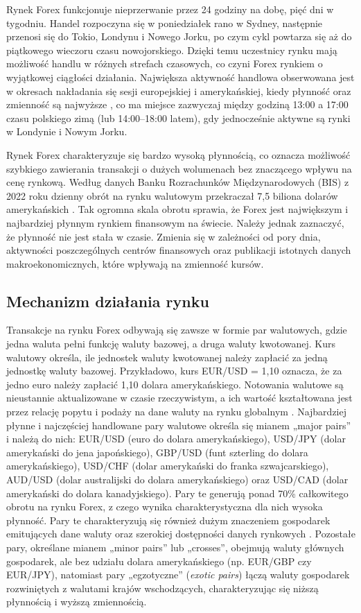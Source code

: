 Rynek Forex funkcjonuje nieprzerwanie przez 24 godziny na dobę, pięć dni w tygodniu. 
Handel rozpoczyna się w poniedziałek rano w Sydney, następnie przenosi się do Tokio, Londynu i Nowego Jorku, po czym cykl powtarza się aż do piątkowego wieczoru czasu nowojorskiego.
Dzięki temu uczestnicy rynku mają możliwość handlu w różnych strefach czasowych, co czyni Forex rynkiem o wyjątkowej ciągłości działania. 
Największa aktywność handlowa obserwowana jest w okresach nakładania się sesji europejskiej i amerykańskiej, kiedy płynność oraz zmienność są najwyższe \parencite{bis2022},
co ma miejsce zazwyczaj między godziną 13:00 a 17:00 czasu polskiego zimą (lub 14:00–18:00 latem), gdy jednocześnie aktywne są rynki w Londynie i Nowym Jorku.

Rynek Forex charakteryzuje się bardzo wysoką płynnością, co oznacza możliwość szybkiego zawierania transakcji o dużych wolumenach bez znaczącego wpływu na cenę rynkową. 
Według danych Banku Rozrachunków Międzynarodowych (BIS) z 2022 roku dzienny obrót na rynku walutowym przekraczał 7,5 biliona dolarów amerykańskich \parencite{bis2022}.
Tak ogromna skala obrotu sprawia, że Forex jest największym i najbardziej płynnym rynkiem finansowym na świecie.
Należy jednak zaznaczyć, że płynność nie jest stała w czasie. Zmienia się w zależności od pory dnia, aktywności poszczególnych centrów finansowych oraz publikacji istotnych danych makroekonomicznych,
które wpływają na zmienność kursów.

\subsection{Mechanizm działania rynku}

Transakcje na rynku Forex odbywają się zawsze w formie par walutowych, gdzie jedna waluta pełni funkcję waluty bazowej, a druga waluty kwotowanej. 
Kurs walutowy określa, ile jednostek waluty kwotowanej należy zapłacić za jedną jednostkę waluty bazowej. 
Przykładowo, kurs EUR/USD = 1,10 oznacza, że za jedno euro należy zapłacić 1,10 dolara amerykańskiego. 
Notowania walutowe są nieustannie aktualizowane w czasie rzeczywistym, a ich wartość kształtowana jest przez relację popytu i podaży na dane waluty na rynku globalnym \parencite{hull2018}. 
Najbardziej płynne i najczęściej handlowane pary walutowe określa się mianem „major pairs” i należą do nich: EUR/USD (euro do dolara amerykańskiego),
USD/JPY (dolar amerykański do jena japońskiego), GBP/USD (funt szterling do dolara amerykańskiego), USD/CHF (dolar amerykański do franka szwajcarskiego), 
AUD/USD (dolar australijski do dolara amerykańskiego) oraz USD/CAD (dolar amerykański do dolara kanadyjskiego). 
Pary te generują ponad 70\% całkowitego obrotu na rynku Forex, z czego wynika charakterystyczna dla nich wysoka płynność. 
Pary te charakteryzują się również dużym znaczeniem gospodarek emitujących dane waluty oraz szerokiej dostępności danych rynkowych \parencite{bis2022}. 
Pozostałe pary, określane mianem „minor pairs” lub „crosses”, obejmują waluty głównych gospodarek, ale bez udziału dolara amerykańskiego (np. EUR/GBP czy EUR/JPY), 
natomiast pary „egzotyczne” (\textit{exotic pairs}) łączą waluty gospodarek rozwiniętych z walutami krajów wschodzących, charakteryzując się niższą płynnością i wyższą zmiennością.


